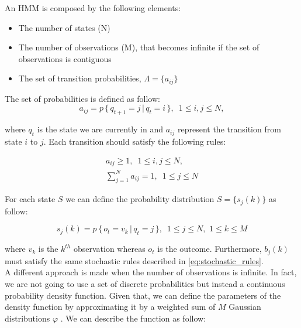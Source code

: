 \noindent An HMM is composed by the following elements:

\begin{itemize}
	\item The number of states (N)
	\item The number of observations (M), that becomes infinite if the set of observations is contiguous
	\item The set of transition probabilities, $\Lambda = \{ a_{ij}\}$
\end{itemize}

The set of probabilities is defined as follow:
\begin{equation}
\label{eq:transition_probabilities}
a_{ij} = p \, \{ \, q_{t+1} = j \, | \, q_{t} = i \, \}, \, \, \, 1 \leq i,j \leq N,
\end{equation}

\noindent where $q_{t}$ is the state we are currently in and $a_{ij}$ represent the transition from state $i$ to $j$.
Each transition should satisfy the following rules:

\begin{subequations}
	\label{eq:stochastic_rules}
	\begin{align}
	a_{ij} \geq 1, \, \, \, 1 \leq i,j \leq N, \\
	\sum_{j=1}^{N} a_{ij} = 1, \, \, \, 1 \leq j \leq N
	\end{align}
\end{subequations}

\noindent For each state $S$ we can define the probability distribution $S = \{s_{j}(k)\}$ as follow:

\begin{equation}
s_{j}(k) = p \, \{\, o_{t} = v_{k} \, | \, q_{t} = j \, \}, \, \, \, 1 \leq j \leq N, \,\, 1 \leq k \leq M
\end{equation}

\noindent where $v_k$ is the $k^{th}$ observation whereas $o_{t}$ is the outcome. Furthermore, $b_{j}(k)$ must satisfy the same stochastic rules described in \ref{eq:stochastic_rules}. \\

\noindent A different approach is made when the number of observations is infinite. In fact, we are not going to use a set of discrete probabilities but instead a continuous probability density function. Given that, we can define the parameters of the density function by approximating it by a weighted sum of $M$ Gaussian distributions $\varphi$ \cite{def_hmm}. We can describe the function as follow:

